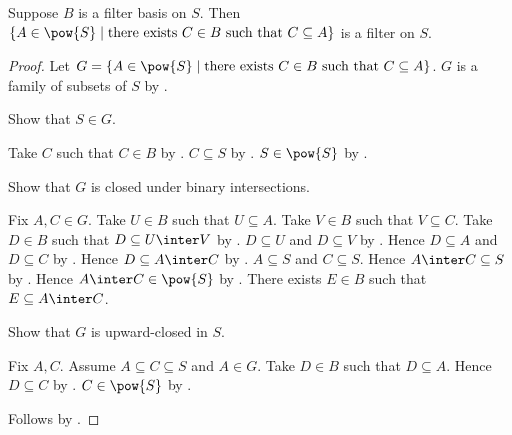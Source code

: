 \begin{proposition}\label{filter_basis_supersets_are_filter}
    Suppose $B$ is a filter basis on $S$.
    Then
        $\{A\in\pow{S}\mid
            \text{there exists $C\in B$ such that $C\subseteq A$}\}$
        is a filter on $S$.
\end{proposition}
\begin{proof}
    Let $G=\{A\in\pow{S}\mid
        \text{there exists $C\in B$ such that $C\subseteq A$}\}$.
    $G$ is a family of subsets of $S$
        by .

    Show that $S\in G$.
    \begin{subproof}
        Take $C$ such that $C\in B$ by .
        $C\subseteq S$ by .
        $S\in\pow{S}$ by .
    \end{subproof}

    Show that $G$ is closed under binary intersections.
    \begin{subproof}
        Fix $A,C\in G$.
        Take $U\in B$ such that $U\subseteq A$.
        Take $V\in B$ such that $V\subseteq C$.
        Take $D\in B$ such that $D\subseteq U\inter V$
            by .
        $D\subseteq U$ and $D\subseteq V$
            by .
        Hence $D\subseteq A$ and $D\subseteq C$
            by .
        Hence $D\subseteq A\inter C$ by .
        $A\subseteq S$ and $C\subseteq S$.
        Hence $A\inter C\subseteq S$ by .
        Hence $A\inter C\in\pow{S}$ by .
        There exists $E\in B$ such that $E\subseteq A\inter C$.
    \end{subproof}

    Show that $G$ is upward-closed in $S$.
    \begin{subproof}
        Fix $A,C$.
        Assume $A\subseteq C\subseteq S$ and $A\in G$.
        Take $D\in B$ such that $D\subseteq A$.
        Hence $D\subseteq C$ by .
        $C\in\pow{S}$ by .
    \end{subproof}
    Follows by .
\end{proof}

